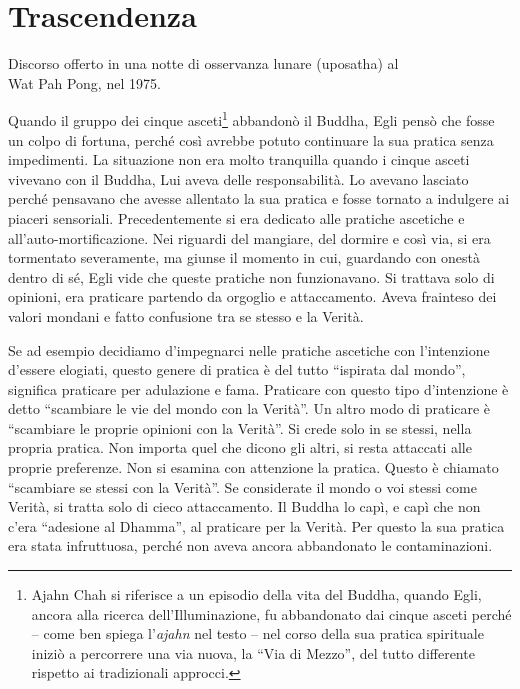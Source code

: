 \chapter{Trascendenza}

\begin{openingQuote}
  \centering

  Discorso offerto in una notte di osservanza lunare (uposatha) al\\
  Wat Pah Pong, nel 1975.
\end{openingQuote}

Quando il gruppo dei cinque asceti\footnote{Ajahn Chah si riferisce a un
  episodio della vita del Buddha, quando Egli, ancora alla ricerca
  dell'Illuminazione, fu abbandonato dai cinque asceti perché -- come
  ben spiega l'\emph{ajahn} nel testo -- nel corso della sua pratica
  spirituale iniziò a percorrere una via nuova, la ``Via di Mezzo'', del
  tutto differente rispetto ai tradizionali approcci.} abbandonò il
Buddha, Egli pensò che fosse un colpo di fortuna, perché così avrebbe
potuto continuare la sua pratica senza impedimenti. La situazione non
era molto tranquilla quando i cinque asceti vivevano con il Buddha, Lui
aveva delle responsabilità. Lo avevano lasciato perché pensavano che
avesse allentato la sua pratica e fosse tornato a indulgere ai piaceri
sensoriali. Precedentemente si era dedicato alle pratiche ascetiche e
all'auto-mortificazione. Nei riguardi del mangiare, del dormire e così
via, si era tormentato severamente, ma giunse il momento in cui,
guardando con onestà dentro di sé, Egli vide che queste pratiche non
funzionavano. Si trattava solo di opinioni, era praticare partendo da
orgoglio e attaccamento. Aveva frainteso dei valori mondani e fatto
confusione tra se stesso e la Verità.

Se ad esempio decidiamo d'impegnarci nelle pratiche ascetiche con
l'intenzione d'essere elogiati, questo genere di pratica è del tutto
``ispirata dal mondo'', significa praticare per adulazione e fama.
Praticare con questo tipo d'intenzione è detto ``scambiare le vie del
mondo con la Verità''. Un altro modo di praticare è ``scambiare le
proprie opinioni con la Verità''. Si crede solo in se stessi, nella
propria pratica. Non importa quel che dicono gli altri, si resta
attaccati alle proprie preferenze. Non si esamina con attenzione la
pratica. Questo è chiamato ``scambiare se stessi con la Verità''. Se
considerate il mondo o voi stessi come Verità, si tratta solo di cieco
attaccamento. Il Buddha lo capì, e capì che non c'era ``adesione al
Dhamma'', al praticare per la Verità. Per questo la sua pratica era
stata infruttuosa, perché non aveva ancora abbandonato le
contaminazioni.

